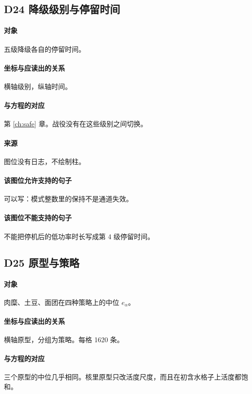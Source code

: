 \subsection{D24 降级级别与停留时间}
\paragraph{对象}
五级降级各自的停留时间。

\paragraph{坐标与应读出的关系}
横轴级别，纵轴时间。

\paragraph{与方程的对应}
第 \ref{ch:safe} 章。战役没有在这些级别之间切换。

\paragraph{来源}
图位没有日志，不绘制柱。

\paragraph{该图位允许支持的句子}
可以写：模式整数里的保持不是通道失效。

\paragraph{该图位不能支持的句子}
不能把停机后的低功率时长写成第 4 级停留时间。

\subsection{D25 原型与策略}
\paragraph{对象}
肉糜、土豆、面团在四种策略上的中位 $e_\alpha$。

\paragraph{坐标与应读出的关系}
横轴原型，分组为策略。每格 1620 条。

\paragraph{与方程的对应}
三个原型的中位几乎相同。核里原型只改活度尺度，而且在初含水格子上活度都饱和。

